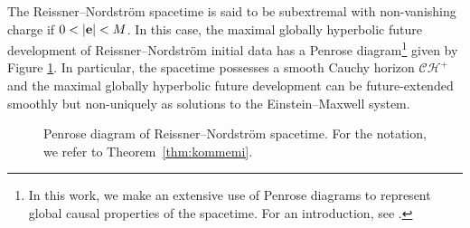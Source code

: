 \documentclass[10pt, reqno]{amsart}
\theoremstyle{definition}
\theoremstyle{remark}
\numberwithin{equation}{section}
\newcommand{\0}{\emptyset}
\begin{document}
The Reissner--Nordstr\"om spacetime is said to be subextremal with non-vanishing charge if $0<|{\bf e}|<M$. In this case, the maximal globally hyperbolic future development of Reissner--Nordstr\"om initial data has a Penrose diagram\footnote{In this work, we make an extensive use of Penrose diagrams to represent global causal properties of the spacetime. For an introduction, see \cite[Appendix~C]{DRPL}.} given by Figure \ref{fig:RN}. In particular, the spacetime possesses a smooth Cauchy horizon $\mathcal C\mathcal H^+$ and the maximal globally hyperbolic future development can be future-extended smoothly but non-uniquely as solutions to the Einstein--Maxwell system. 

\begin{figure}[h]
\begin{center}
\def\svgwidth{200px}
 
\caption{Penrose diagram of Reissner--Nordstr\"om spacetime. For the notation, we refer to Theorem~\ref{thm:kommemi}.} \label{fig:RN}
\end{center}
\end{figure}
\end{document}
